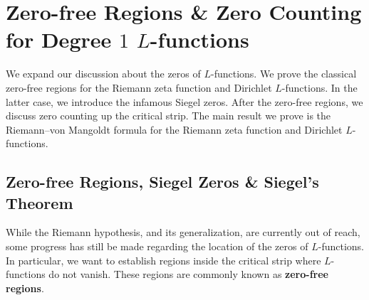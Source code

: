 \chapter{Zero-free Regions \& Zero Counting for Degree \texorpdfstring{$1$}{1} \texorpdfstring{$L$}{L}-functions}
  We expand our discussion about the zeros of $L$-functions. We prove the classical zero-free regions for the Riemann zeta function and Dirichlet $L$-functions. In the latter case, we introduce the infamous Siegel zeros. After the zero-free regions, we discuss zero counting up the critical strip. The main result we prove is the Riemann–von Mangoldt formula for the Riemann zeta function and Dirichlet $L$-functions.
  \section{Zero-free Regions, Siegel Zeros \& Siegel's Theorem}
    While the Riemann hypothesis, and its generalization, are currently out of reach, some progress has still be made regarding the location of the zeros of $L$-functions. In particular, we want to establish regions inside the critical strip where $L$-functions do not vanish. These regions are commonly known as \textbf{zero-free regions}.
